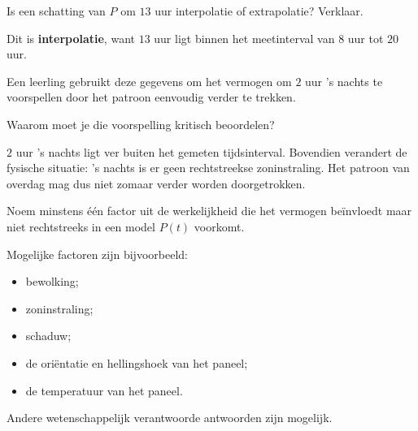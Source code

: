 \documentclass{ximera}
\begin{document}
\begin{oefening}{\oefU \ESS}
\begin{question}
\end{question}

\begin{question}
Is een schatting van $P$ om $13$ uur interpolatie of extrapolatie?
Verklaar.

\begin{freeResponse}
\end{freeResponse}


\begin{oplossing}
Dit is \textbf{interpolatie}, want $13$ uur ligt binnen het
meetinterval van $8$ uur tot $20$ uur.
\end{oplossing}

\end{question}

\begin{question}
Een leerling gebruikt deze gegevens om het vermogen om $2$ uur 's nachts
te voorspellen door het patroon eenvoudig verder te trekken.

Waarom moet je die voorspelling kritisch beoordelen?

\begin{freeResponse}
\end{freeResponse}


\begin{oplossing}
$2$ uur 's nachts ligt ver buiten het gemeten tijdsinterval.
Bovendien verandert de fysische situatie: 's nachts is er geen
rechtstreekse zoninstraling. Het patroon van overdag mag dus niet
zomaar verder worden doorgetrokken.
\end{oplossing}

\end{question}

\begin{question}
Noem minstens één factor uit de werkelijkheid die het vermogen beïnvloedt
maar niet rechtstreeks in een model $P(t)$ voorkomt.

\begin{freeResponse}
\end{freeResponse}


\begin{oplossing}
Mogelijke factoren zijn bijvoorbeeld:
\begin{itemize}
  \item bewolking;
  \item zoninstraling;
  \item schaduw;
  \item de oriëntatie en hellingshoek van het paneel;
  \item de temperatuur van het paneel.
\end{itemize}
Andere wetenschappelijk verantwoorde antwoorden zijn mogelijk.
\end{oplossing}

\end{question}

\end{oefening}
\end{document}
